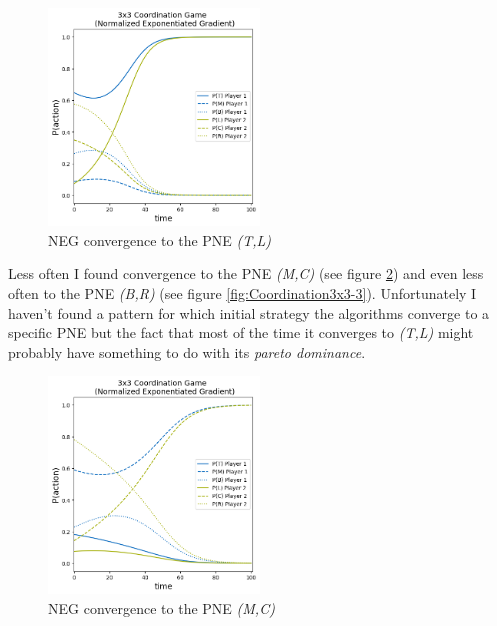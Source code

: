 \begin{figure}[H]
    \centering
    \includegraphics[width=0.5\textwidth]{logos/Coordination3x3-1.png}
    \caption{NEG convergence to the PNE \textit{(T,L)}}
    \label{fig:Coordination3x3-1}
\end{figure}

Less often I found convergence to the PNE \textit{(M,C)} (see figure \ref{fig:Coordination3x3-2}) and even less often to the PNE \textit{(B,R)} (see figure \ref{fig:Coordination3x3-3}). Unfortunately I haven't found a pattern for which initial strategy the algorithms converge to a specific PNE but the fact that most of the time it converges to \textit{(T,L)} might probably have something to do with its \textit{pareto dominance}. 

\begin{figure}[H]
    \centering
    \includegraphics[width=0.5\textwidth]{logos/Coordination3x3-2.png}
    \caption{NEG convergence to the PNE \textit{(M,C)}}
    \label{fig:Coordination3x3-2}
\end{figure}

